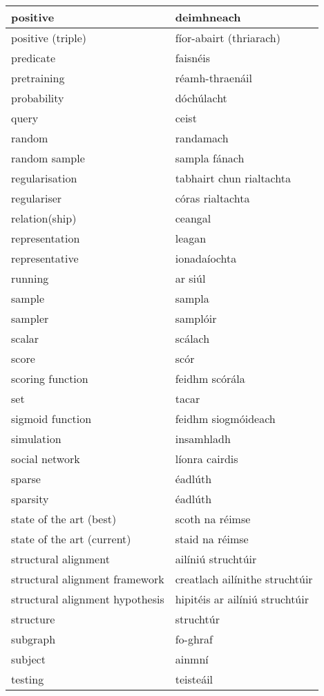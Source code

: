 \documentclass{article}
\begin{document}
\begin{longtable}{|l|l|}
		positive&deimhneach\\ \hline 
		positive (triple)&fíor-abairt (thriarach)\\ \hline 
		predicate&faisnéis\\ \hline 
		pretraining&réamh-thraenáil\\ \hline 
		probability&dóchúlacht\\ \hline 
		query&ceist\\ \hline 
		random&randamach\\ \hline 
		random sample&sampla fánach\\ \hline 
		regularisation&tabhairt chun rialtachta\\ \hline 
		regulariser&córas rialtachta\\ \hline 
		relation(ship)&ceangal\\ \hline 
		representation&leagan\\ \hline 
		representative&ionadaíochta\\ \hline 
		running&ar siúl\\ \hline 
		sample&sampla\\ \hline 
		sampler&samplóir\\ \hline 
		scalar&scálach\\ \hline 
		score&scór\\ \hline 
		scoring function&feidhm scórála\\ \hline 
		set&tacar\\ \hline 
		sigmoid function&feidhm siogmóideach\\ \hline 
		simulation&insamhladh\\ \hline 
		social network&líonra cairdis\\ \hline 
		sparse&éadlúth\\ \hline 
		sparsity&éadlúth\\ \hline 
		state of the art (best)&scoth na réimse\\ \hline 
		state of the art (current)&staid na réimse\\ \hline 
		structural alignment&ailíniú struchtúir\\ \hline 
		structural alignment framework&creatlach ailínithe struchtúir\\ \hline 
		structural alignment hypothesis&hipitéis ar ailíniú struchtúir\\ \hline 
		structure&struchtúr\\ \hline 
		subgraph&fo-ghraf\\ \hline 
		subject&ainmní\\ \hline 
		testing&teisteáil\\ \hline 

\end{longtable}
\end{document}
